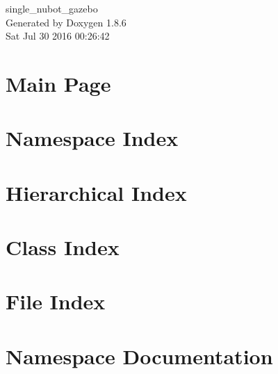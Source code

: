 \documentclass[twoside]{book}
\newcommand{\clearemptydoublepage}{%
  \newpage{\pagestyle{empty}\cleardoublepage}%
}
\begin{document}
\hypersetup{pageanchor=false}
\begin{titlepage}
\vspace*{7cm}
\begin{center}%
{\Large single\-\_\-nubot\-\_\-gazebo }\\
\vspace*{1cm}
{\large Generated by Doxygen 1.8.6}\\
\vspace*{0.5cm}
{\small Sat Jul 30 2016 00:26:42}\\
\end{center}
\end{titlepage}
\clearemptydoublepage
\tableofcontents
\clearemptydoublepage
{}
\hypersetup{pageanchor=true}

\chapter{Main Page}
\label{index}\hypertarget{index}{}
\chapter{Namespace Index}

\chapter{Hierarchical Index}

\chapter{Class Index}

\chapter{File Index}

\chapter{Namespace Documentation}





















\end{document}
